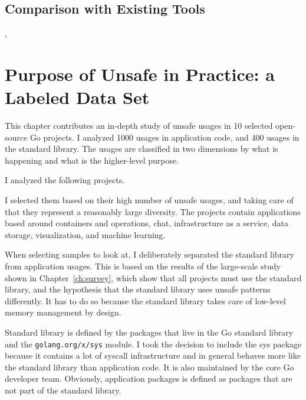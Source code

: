 



\subsection{Comparison with Existing Tools}\label{subsec:go-geiger:evaluation:linters-comparison}

\toolVet{}, \toolGosec{}





\section{Purpose of Unsafe in Practice: a Labeled Data Set}\label{sec:go-geiger:labeled-dataset}

This chapter contributes an in-depth study of unsafe usages in 10 selected open-source Go projects.
I analyzed 1000 usages in application code, and 400 usages in the standard library.
The usages are classified in two dimensions by what is happening and what is the higher-level purpose.

I analyzed the following projects.



I selected them based on their high number of unsafe usages, and taking care of that they represent a reasonably large
diversity.
The projects contain applications based around containers and operations, chat, infrastructure as a service, data
storage, visualization, and machine learning.

When selecting samples to look at, I deliberately separated the standard library from application usages.
This is based on the results of the large-scale study shown in Chapter~\ref{ch:survey}, which show that all projects
must use the standard library, and the hypothesis that the standard library uses unsafe patterns differently.
It has to do so because the standard library takes care of low-level memory management by design.

Standard library is defined by the packages that live in the Go standard library and the \texttt{golang.org/x/sys}
module.
I took the decision to include the sys package because it contains a lot of syscall infrastructure and in general
behaves more like the standard library than application code.
It is also maintained by the core Go developer team.
Obviously, application packages is defined as packages that are not part of the standard library.

